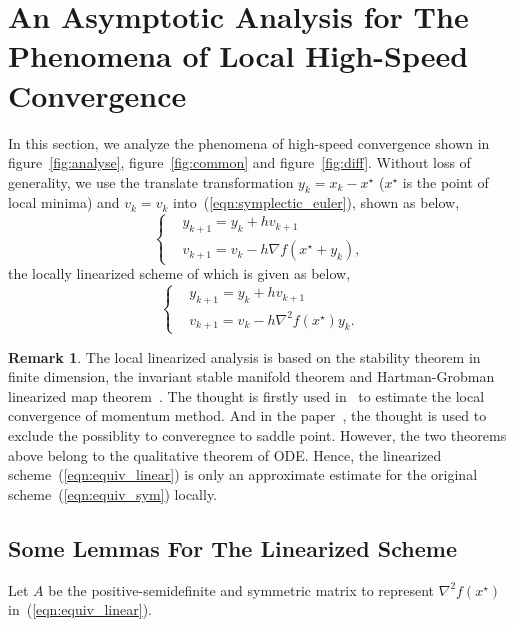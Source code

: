 \documentclass[11pt,fceqn]{article}
\numberwithin{equation}{section}
\theoremstyle{definition}
\newtheorem{rem}[thm]{Remark}
\begin{document}
\section{An Asymptotic Analysis for The Phenomena of Local High-Speed Convergence}
\label{sec:local}
In this section, we analyze the phenomena of high-speed convergence shown in figure~\ref{fig:analyse}, figure~\ref{fig:common} and figure~\ref{fig:diff}. Without loss of generality, we use the translate transformation $y_{k} = x_{k} -x^{\star}$ ($x^{\star}$ is the point of local minima) and $v_{k}=v_{k}$ into~(\ref{eqn:symplectic_euler}), shown as below,
\begin{equation}
\label{eqn:equiv_sym}
\left\{
\begin{aligned}
&y_{k+1} = y_{k} + hv_{k+1} \\
&v_{k+1} = v_{k} - h\nabla f(x^{\star} + y_{k}),
\end{aligned}
\right.
\end{equation}
the locally linearized scheme of which is given as below,
\begin{equation}
\label{eqn:equiv_linear}
\left\{
\begin{aligned}
&y_{k+1} = y_{k} + hv_{k+1} \\
&v_{k+1} = v_{k} - h\nabla^{2} f(x^{\star})y_{k}.
\end{aligned}
\right.
\end{equation}
\begin{rem}
The local linearized analysis is based on the stability theorem in finite dimension, the invariant stable manifold theorem and Hartman-Grobman linearized map theorem~\citep{hartman1982ordinary}. The thought is firstly used in~\citep{polyak1964some} to estimate the local convergence of momentum method. And in the paper~\citep{lee2016gradient}, the thought is used to exclude the possiblity to converegnce to saddle point. However, the two theorems above belong to the qualitative theorem of ODE. Hence, the linearized scheme~(\ref{eqn:equiv_linear}) is only an approximate estimate for the original scheme~(\ref{eqn:equiv_sym}) locally.
\end{rem}
\subsection{Some Lemmas For The Linearized Scheme}
Let $A$ be the positive-semidefinite and symmetric matrix to represent $\nabla^{2}f(x^{\star})$ in~(\ref{eqn:equiv_linear}).
 
\end{document}
